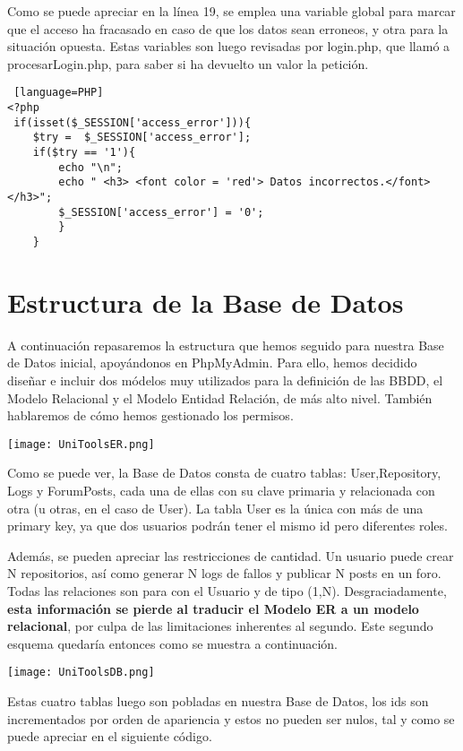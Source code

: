 \documentclass[12pt]{report}
\begin{document}
Como se puede apreciar en la línea 19, se emplea una variable global para marcar que el acceso ha fracasado en caso de que los datos sean erroneos, y otra para la situación opuesta. Estas variables son luego revisadas por login.php, que llamó a procesarLogin.php, para saber si ha devuelto un valor la petición.
\newline
\begin{lstlisting} [language=PHP]
<?php
 if(isset($_SESSION['access_error'])){
    $try =  $_SESSION['access_error'];
    if($try == '1'){
        echo "\n";
        echo " <h3> <font color = 'red'> Datos incorrectos.</font> </h3>";
        $_SESSION['access_error'] = '0';
        }
    }
\end{lstlisting}

\newpage
\section{Estructura de la Base de Datos}
A continuación repasaremos la estructura que hemos seguido para nuestra Base de Datos inicial, apoyándonos en PhpMyAdmin. Para ello, hemos decidido diseñar e incluir dos módelos muy utilizados para la definición de las BBDD, el Modelo Relacional y el Modelo Entidad Relación, de más alto nivel. También hablaremos de cómo hemos gestionado los permisos.
\newline


\texttt{[image: UniToolsER.png]}

Como se puede ver, la Base de Datos consta de cuatro tablas: User,Repository, Logs y ForumPosts, cada una de ellas con su clave primaria y relacionada con otra (u otras, en el caso de User). La tabla User es la única con más de una primary key, ya que dos usuarios podrán tener el mismo id pero diferentes roles. 

Además, se pueden apreciar las restricciones de cantidad. Un usuario puede crear N repositorios, así como generar N logs de fallos y publicar N posts en un foro. Todas las relaciones son para con el Usuario y de tipo (1,N). Desgraciadamente, \textbf{esta información se pierde al traducir el Modelo ER a un modelo relacional}, por culpa de las limitaciones inherentes al segundo. Este segundo esquema quedaría entonces como se muestra a continuación.
\newline

\texttt{[image: UniToolsDB.png]}

Estas cuatro tablas luego son pobladas en nuestra Base de Datos, los ids son incrementados por orden de apariencia y estos no pueden ser nulos, tal y como se puede apreciar en el siguiente código.
\end{document}
